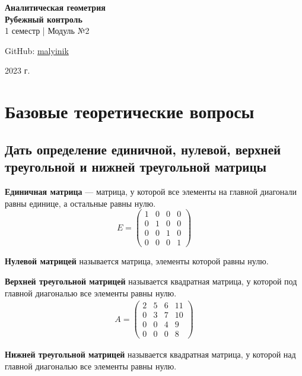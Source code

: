 



\begin{titlepage}
    \vspace*{0pt}
    \vfill
    \centering
    \Huge\textbf{Аналитическая геометрия} \\[7pt]
    \Large\textbf{Рубежный контроль} \\
    \large 1 семестр | Модуль №2 \\ 
    \vfill
    \begin{flushright}
        \normalsize GitHub: \href{https://github.com/malyinik}{malyinik} \\
    \end{flushright}
    \normalsize 2023 г.
\end{titlepage}
\newpage

\tableofcontents
\newpage

\section{Базовые теоретические вопросы}
\subsection{Дать определение единичной, нулевой, верхней треугольной и нижней треугольной матрицы}
\begin{definition*}
	\textbf{Единичная матрица} --- матрица, у которой все элементы на главной диагонали равны единице, а остальные равны нулю.
	\[ E = \begin{pmatrix}
			1 & 0 & 0 & 0 \\
			0 & 1 & 0 & 0 \\
			0 & 0 & 1 & 0 \\
			0 & 0 & 0 & 1
		\end{pmatrix} \]
\end{definition*}
\begin{definition*}
	\textbf{Нулевой матрицей} называется матрица, элементы которой равны нулю.
\end{definition*}
\begin{definition*}
	\textbf{Верхней треугольной матрицей} называется квадратная матрица, у которой под главной диагональю все элементы равны нулю.
	\begin{gather*}
		A = \begin{pmatrix}
			2 & 5 & 6 & 11 \\
			0 & 3 & 7 & 10 \\
			0 & 0 & 4 & 9  \\
			0 & 0 & 0 & 8
		\end{pmatrix}
	\end{gather*}
\end{definition*}
\begin{definition*}
	\textbf{Нижней треугольной матрицей} называется квадратная матрица, у которой над главной диагональю все элементы равны нулю.
\end{definition*}

